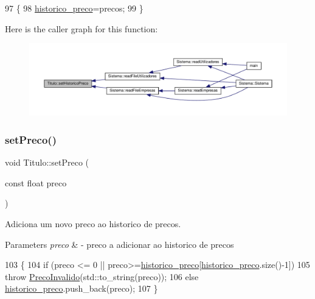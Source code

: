 \begin{DoxyCode}
97                                                               \{
98      \hyperlink{classTitulo_aad5a44ca7e83939e8b47f1e11b80eca2}{historico\_preco}=precos;
99  \}
\end{DoxyCode}
Here is the caller graph for this function\+:
\nopagebreak
\begin{figure}[H]
\begin{center}
\leavevmode
\includegraphics[width=350pt]{classTitulo_a8ea091928732a5ff5b974e003668a778_icgraph}
\end{center}
\end{figure}
\mbox{\label{classTitulo_a08d0b556bebf6863edb62ed5dc19923c}} 
\subsubsection{\texorpdfstring{set\+Preco()}{setPreco()}}
{\footnotesize\ttfamily void Titulo\+::set\+Preco (\begin{DoxyParamCaption}\item[{const float}]{preco }\end{DoxyParamCaption})}



Adiciona um novo preco ao historico de precos. 


\begin{DoxyParams}{Parameters}
{\em preco} & -\/ preco a adicionar ao historico de precos \\
\hline
\end{DoxyParams}

\begin{DoxyCode}
103                                         \{
104     \textcolor{keywordflow}{if} (preco <= 0 || preco>=\hyperlink{classTitulo_aad5a44ca7e83939e8b47f1e11b80eca2}{historico\_preco}[\hyperlink{classTitulo_aad5a44ca7e83939e8b47f1e11b80eca2}{historico\_preco}.size()-1])
105         \textcolor{keywordflow}{throw} \hyperlink{classPrecoInvalido}{PrecoInvalido}(std::to\_string(preco));
106     \textcolor{keywordflow}{else} \hyperlink{classTitulo_aad5a44ca7e83939e8b47f1e11b80eca2}{historico\_preco}.push\_back(preco);
107  \}
\end{DoxyCode}
\mbox{\label{classTitulo_ab31e1d801062a75abdb10664de23d897}} 
